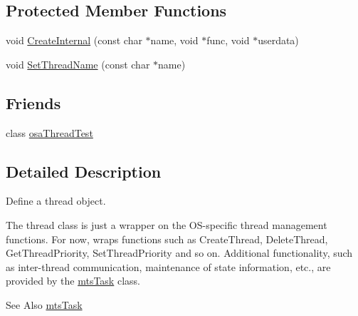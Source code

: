 \subsection*{Protected Member Functions}
\begin{DoxyCompactItemize}
\item 
void \hyperlink{classosa_thread_acf3b3067cff63a6b43483518c71ff90d}{Create\-Internal} (const char $\ast$name, void $\ast$func, void $\ast$userdata)
\item 
void \hyperlink{classosa_thread_a739d50a6c6f7cc6c8fa44e79644cd922}{Set\-Thread\-Name} (const char $\ast$name)
\end{DoxyCompactItemize}
\subsection*{Friends}
\begin{DoxyCompactItemize}
\item 
class \hyperlink{classosa_thread_a542e7acdd9a832dddf65bf204d2df936}{osa\-Thread\-Test}
\end{DoxyCompactItemize}


\subsection{Detailed Description}
Define a thread object. 

The thread class is just a wrapper on the O\-S-\/specific thread management functions. For now, wraps functions such as Create\-Thread, Delete\-Thread, Get\-Thread\-Priority, Set\-Thread\-Priority and so on. Additional functionality, such as inter-\/thread communication, maintenance of state information, etc., are provided by the \hyperlink{classmts_task}{mts\-Task} class.

\begin{DoxySeeAlso}{See Also}
\hyperlink{classmts_task}{mts\-Task} 
\end{DoxySeeAlso}



